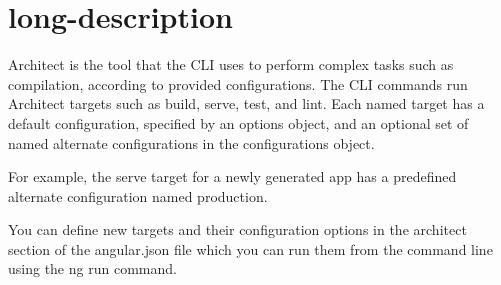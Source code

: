 \chapter{long-\/description}
\hypertarget{md__d_1_2_g_i_t_2_food_link_2foodlink_8client_2node__modules_2_0dangular_2cli_2src_2commands_2run_2long-description}{}\label{md__d_1_2_g_i_t_2_food_link_2foodlink_8client_2node__modules_2_0dangular_2cli_2src_2commands_2run_2long-description}
Architect is the tool that the CLI uses to perform complex tasks such as compilation, according to provided configurations. The CLI commands run Architect targets such as {\ttfamily build}, {\ttfamily serve}, {\ttfamily test}, and {\ttfamily lint}. Each named target has a default configuration, specified by an {\ttfamily options} object, and an optional set of named alternate configurations in the {\ttfamily configurations} object.

For example, the {\ttfamily serve} target for a newly generated app has a predefined alternate configuration named {\ttfamily production}.

You can define new targets and their configuration options in the {\ttfamily architect} section of the {\ttfamily angular.\+json} file which you can run them from the command line using the {\ttfamily ng run} command. 
